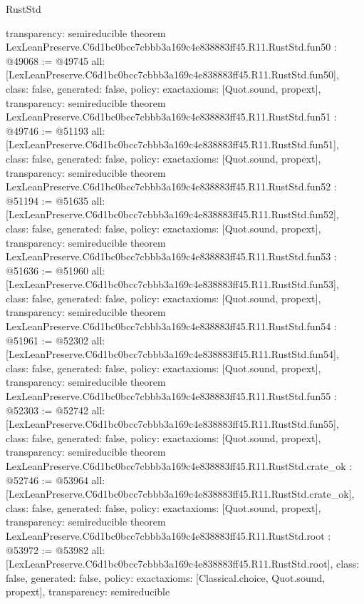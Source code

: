 \begin{lexlean}{RustStd}
\begin{coremodule}
{  transparency: semireducible
}
theorem LexLeanPreserve.C6d1bc0bcc7cbbb3a169c4e838883ff45.R11.RustStd.fun50 : @49068 := @49745 {
  all: [LexLeanPreserve.C6d1bc0bcc7cbbb3a169c4e838883ff45.R11.RustStd.fun50],
  class: false,
  generated: false,
  policy: exact{axioms: [Quot.sound, propext]},
  transparency: semireducible
}
theorem LexLeanPreserve.C6d1bc0bcc7cbbb3a169c4e838883ff45.R11.RustStd.fun51 : @49746 := @51193 {
  all: [LexLeanPreserve.C6d1bc0bcc7cbbb3a169c4e838883ff45.R11.RustStd.fun51],
  class: false,
  generated: false,
  policy: exact{axioms: [Quot.sound, propext]},
  transparency: semireducible
}
theorem LexLeanPreserve.C6d1bc0bcc7cbbb3a169c4e838883ff45.R11.RustStd.fun52 : @51194 := @51635 {
  all: [LexLeanPreserve.C6d1bc0bcc7cbbb3a169c4e838883ff45.R11.RustStd.fun52],
  class: false,
  generated: false,
  policy: exact{axioms: [Quot.sound, propext]},
  transparency: semireducible
}
theorem LexLeanPreserve.C6d1bc0bcc7cbbb3a169c4e838883ff45.R11.RustStd.fun53 : @51636 := @51960 {
  all: [LexLeanPreserve.C6d1bc0bcc7cbbb3a169c4e838883ff45.R11.RustStd.fun53],
  class: false,
  generated: false,
  policy: exact{axioms: [Quot.sound, propext]},
  transparency: semireducible
}
theorem LexLeanPreserve.C6d1bc0bcc7cbbb3a169c4e838883ff45.R11.RustStd.fun54 : @51961 := @52302 {
  all: [LexLeanPreserve.C6d1bc0bcc7cbbb3a169c4e838883ff45.R11.RustStd.fun54],
  class: false,
  generated: false,
  policy: exact{axioms: [Quot.sound, propext]},
  transparency: semireducible
}
theorem LexLeanPreserve.C6d1bc0bcc7cbbb3a169c4e838883ff45.R11.RustStd.fun55 : @52303 := @52742 {
  all: [LexLeanPreserve.C6d1bc0bcc7cbbb3a169c4e838883ff45.R11.RustStd.fun55],
  class: false,
  generated: false,
  policy: exact{axioms: [Quot.sound, propext]},
  transparency: semireducible
}
theorem LexLeanPreserve.C6d1bc0bcc7cbbb3a169c4e838883ff45.R11.RustStd.crate_ok : @52746 := @53964 {
  all: [LexLeanPreserve.C6d1bc0bcc7cbbb3a169c4e838883ff45.R11.RustStd.crate_ok],
  class: false,
  generated: false,
  policy: exact{axioms: [Quot.sound, propext]},
  transparency: semireducible
}
theorem LexLeanPreserve.C6d1bc0bcc7cbbb3a169c4e838883ff45.R11.RustStd.root : @53972 := @53982 {
  all: [LexLeanPreserve.C6d1bc0bcc7cbbb3a169c4e838883ff45.R11.RustStd.root],
  class: false,
  generated: false,
  policy: exact{axioms: [Classical.choice, Quot.sound, propext]},
  transparency: semireducible
}


\end{coremodule}
\end{lexlean}
